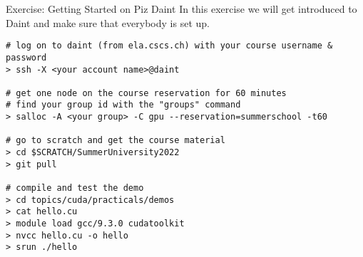 \documentclass[aspectratio=43]{beamer}
\begin{document}
\begin{frame}[fragile]{Exercise: Getting Started on Piz Daint}
    In this exercise we will get introduced to Daint and make sure that everybody is set up.

    \begin{terminal}{}
        \begin{lstlisting}[style=terminal]
# log on to daint (from ela.cscs.ch) with your course username & password
> ssh -X <your account name>@daint

# get one node on the course reservation for 60 minutes
# find your group id with the "groups" command
> salloc -A <your group> -C gpu --reservation=summerschool -t60

# go to scratch and get the course material
> cd $SCRATCH/SummerUniversity2022
> git pull

# compile and test the demo
> cd topics/cuda/practicals/demos
> cat hello.cu
> module load gcc/9.3.0 cudatoolkit
> nvcc hello.cu -o hello
> srun ./hello
        \end{lstlisting}
    \end{terminal}
\end{frame}
\end{document}
